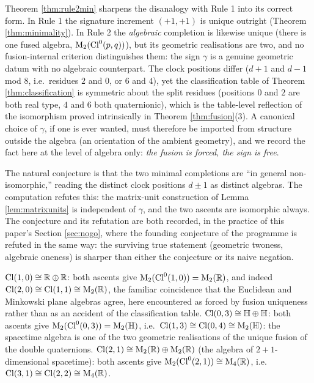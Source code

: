 \begin{remark}\label{rem:forgottenbit}
Theorem \ref{thm:rule2min} sharpens the disanalogy with Rule 1 into its correct form. In Rule 1 the signature increment $(+1,+1)$ is unique outright (Theorem \ref{thm:minimality}). In Rule 2 the \emph{algebraic} completion is likewise unique (there is one fused algebra, $\mathrm{M}_2(\mathrm{Cl}^0(p,q))$), but its geometric realisations are two, and no fusion-internal criterion distinguishes them: the sign $\gamma$ is a genuine geometric datum with no algebraic counterpart. The clock positions differ ($d + 1$ and $d - 1$ mod 8, i.e.\ residues $2$ and $0$, or $6$ and $4$), yet the classification table of Theorem \ref{thm:classification} is symmetric about the split residues (positions $0$ and $2$ are both real type, $4$ and $6$ both quaternionic), which is the table-level reflection of the isomorphism proved intrinsically in Theorem \ref{thm:fusion}(3). A canonical choice of $\gamma$, if one is ever wanted, must therefore be imported from structure outside the algebra (an orientation of the ambient geometry), and we record the fact here at the level of algebra only: \emph{the fusion is forced, the sign is free}.
\end{remark}

\begin{remark}\label{rem:correction}
The natural conjecture is that the two minimal completions are ``in general non-isomorphic,'' reading the distinct clock positions $d \pm 1$ as distinct algebras. The computation refutes this: the matrix-unit construction of Lemma \ref{lem:matrixunits} is independent of $\gamma$, and the two ascents are isomorphic always. The conjecture and its refutation are both recorded, in the practice of this paper's Section \ref{sec:nogo}, where the founding conjecture of the programme is refuted in the same way: the surviving true statement (geometric twoness, algebraic oneness) is sharper than either the conjecture or its naive negation.
\end{remark}

\begin{example}\label{ex:fusions}
$\mathrm{Cl}(1,0) \cong \mathbb{R} \oplus \mathbb{R}$: both ascents give $\mathrm{M}_2(\mathrm{Cl}^0(1,0)) = \mathrm{M}_2(\mathbb{R})$, and indeed $\mathrm{Cl}(2,0) \cong \mathrm{Cl}(1,1) \cong \mathrm{M}_2(\mathbb{R})$, the familiar coincidence that the Euclidean and Minkowski plane algebras agree, here encountered as forced by fusion uniqueness rather than as an accident of the classification table. $\mathrm{Cl}(0,3) \cong \mathbb{H} \oplus \mathbb{H}$: both ascents give $\mathrm{M}_2(\mathrm{Cl}^0(0,3)) = \mathrm{M}_2(\mathbb{H})$, i.e.\ $\mathrm{Cl}(1,3) \cong \mathrm{Cl}(0,4) \cong \mathrm{M}_2(\mathbb{H})$: the spacetime algebra is one of the two geometric realisations of the unique fusion of the double quaternions. $\mathrm{Cl}(2,1) \cong \mathrm{M}_2(\mathbb{R}) \oplus \mathrm{M}_2(\mathbb{R})$ (the algebra of $2{+}1$-dimensional spacetime): both ascents give $\mathrm{M}_2(\mathrm{Cl}^0(2,1)) \cong \mathrm{M}_4(\mathbb{R})$, i.e.\ $\mathrm{Cl}(3,1) \cong \mathrm{Cl}(2,2) \cong \mathrm{M}_4(\mathbb{R})$.
\end{example}

